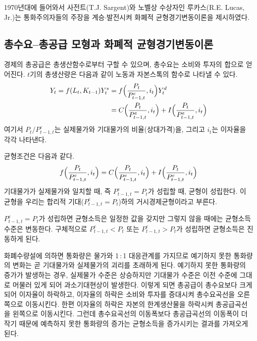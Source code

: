 
 1970년대에 들어와서 사전트(T.J. Sargent)와
 노벨상 수상자인 루카스(R.E. Lucas, Jr.)는 통화주의자들의 주장을 계승\hspace*{0.25em}$\cdot$\hspace*{0.25em}발전시켜
 화폐적 균형경기변동이론을 제시하였다.

 \subsection{총수요--총공급 모형과 화폐적 균형경기변동이론}

경제의 총공급은 총생산함수로부터 구할 수 있으며,
총수요는 소비와 투자의 합으로 얻어진다.
$t$기의 총생산량은 다음과 같이 노동과 자본스톡의 함수로
나타낼 수 있다.
\begin{align}
\begin{split}
Y_t = f(L_t, K_{t-1})Y_t^s &= f\Bigl(\dfrac{P_t}{P_{t-1,t}^e}, i_{t}\Bigr) Y_t^d \\
				&= C\Bigl(\dfrac{P_t}{P_{t-1,t}^e}, i_{t}\Bigr) + I\Bigl(\dfrac{P_t}{P_{t-1,t}^e}, i_{t}\Bigr)
\end{split}
				\end{align}
여기서 ${P_t}/P_{t-1,t}^e$는 실제물가와 기대물가의
비율(상대가격)을, 그리고 $i_t$는 이자율을 각각 나타낸다.

균형조건은 다음과 같다.
 \begin{equation}
 f\Bigl(\dfrac{P_t}{P_{t-1,t}^e}, i_{t}\Bigr)
 = C\Bigl(\dfrac{P_t}{P_{t-1,t}^e}, i_{t}\Bigr) + I\Bigl(\dfrac{P_t}{P_{t-1,t}^e}, i_{t}\Bigr)
  \end{equation}
기대물가가 실제물가와 일치할 때, 즉 $P_{t-1,t}^e=P_t$가 성립할 때,
균형이 성립한다. 이 균형을 우리는 합리적
기대($P_{t-1,t}^e=P_t$)하의 거시경제균형이라고 부른다.

$P_{t-1,t}^e=P_t$가 성립하면 균형소득은 일정한 값을 갖지만 그렇지
않을 때에는 균형소득 수준은 변동한다. 구체적으로 $P_{t-1,t}^e<P_t$
또는 $P_{t-1,t}^e>P_t$가 성립하면 균형소득은 진동하게 된다.

화폐수량설에 의하면 통화량은 물가와 1\,:\,1
대응관계를 가지므로 예기하지 못한 통화량의 변화는 곧 기대물가와
실제물가의 괴리를 초래하게 된다. 예기하지 못한 통화량의 증가가
발생하는 경우, 실제물가 수준은 상승하지만 기대물가 수준은 이전
수준에 그대로 머물러 있게 되어 과소기대현상이 발생한다. 이렇게
되면 총공급이 총수요보다 크게 되어 이자율이 하락하고, 이자율의
하락은 소비와 투자를 증대시켜 총수요곡선을 오른쪽으로 이동시킨다.
한편 이자율의 하락은 자본의 한계생산물을 하락시켜 총공급곡선을
왼쪽으로 이동시킨다. 그런데 총수요곡선의 이동폭보다 총공급곡선의
이동폭이 더 작기 때문에 예측하지 못한 통화량의 증가는 균형소득을
증가시키는 결과를 가져오게 된다.

